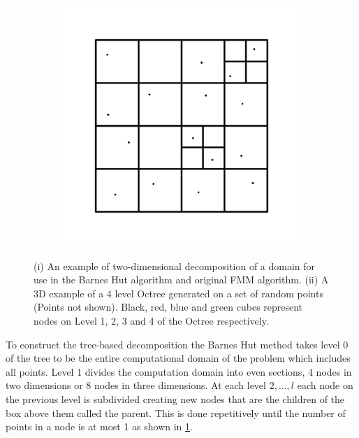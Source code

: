 \begin{figure}
    \begin{subfigure}[b]{0.4\textwidth}
        \centering
        \includegraphics[width=\textwidth]{Images/KIFMM/Decomposition.pdf}
        \caption{\label{fig:2DDecompostion}}
    \end{subfigure}
    \hfill
    \begin{subfigure}[b]{0.4\textwidth}
    \centering
        \resizebox{\linewidth}{!}{}
        \caption{\label{fig:Decompostionexample}}
    \end{subfigure}
    \caption[Decomposition of Domain in 2D and 3D]{(i) An example of two-dimensional decomposition of a domain for use in the Barnes Hut algorithm and original FMM algorithm. (ii) A 3D example of a 4 level Octree generated on a set of random points (Points not shown). Black, red, blue and green cubes represent nodes on Level 1, 2, 3 and 4 of the Octree respectively.}
\end{figure}

To construct the tree-based decomposition the Barnes Hut method takes level 0 of the tree to be the entire computational domain of the problem which includes all points. Level 1 divides the computation domain into even sections, 4 nodes in two dimensions or 8 nodes in three dimensions. At each level $2,\dots,l$ each node on the previous level is subdivided creating new nodes that are the children of the box above them called the parent. This is done repetitively until the number of points in a node is at most 1 as shown in \cref{fig:2DDecompostion}.

